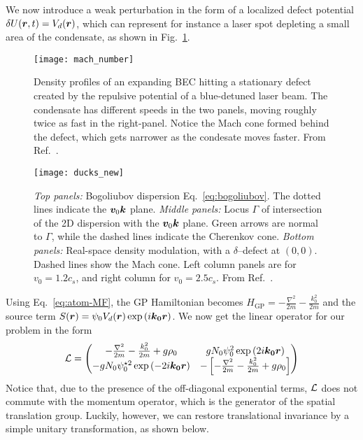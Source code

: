 We now introduce a weak perturbation in the form of a localized defect
potential $\delta U(\bm{r}, t) = V_d(\bm{r})$, which can represent for
instance a laser spot depleting a small area of the condensate, as
shown in Fig.~\ref{fig:mach-number}.
%
\begin{figure}[tb]\centering
  \texttt{[image: mach\_number]}
  \caption{
    Density profiles of an expanding BEC hitting a stationary defect
created by the repulsive potential of a blue-detuned laser beam. The
condensate has different speeds in the two panels, moving roughly
twice as fast in the right-panel. Notice the Mach cone formed behind
the defect, which gets narrower as the condesate moves faster. From
Ref.~\cite{Carusotto_2006}.
}\label{fig:mach-number}
\end{figure}
% 
\begin{figure}[tb]\centering
  \texttt{[image: ducks\_new]}
  \caption{
    \emph{Top panels:} Bogoliubov dispersion
Eq.~\eqref{eq:bogoliubov}. The dotted lines indicate the $\bm{v}_0
\bm{k}$ plane.
    \emph{Middle panels:} Locus $\Gamma$ of intersection of the 2D
dispersion with the $\bm{v}_0 \bm{k}$ plane. Green arrows are normal
to $\Gamma$, while the dashed lines indicate the Cherenkov
cone.
    \emph{Bottom panels:} Real-space density modulation, with a
$\delta$--defect at $(0,0)$. Dashed lines show the Mach cone. Left
column panels are for $v_0 = 1.2 c_s$, and right column for $v_0 = 2.5
c_s$. From Ref.~\cite{9783319002651}.
}\label{fig:bogo-cherenkov}
\end{figure}

Using Eq.~\eqref{eq:atom-MF}, the GP Hamiltonian becomes
$H_{\text{GP}} = -\frac{\nabla^2}{2m} - \frac{k_0^2}{2m}$ and the
source term
$S(\bm{r}) = \psi_0 V_d(\bm{r}) \exp \left( i \bm{k_0} \bm{r} \right)$. We now
get the linear operator for our problem in the form
%
\begin{equation}\label{eq:ourL}
  \mathcal{L} = \begin{pmatrix} -\frac{\nabla^2}{2m} - \frac{k_0^2}{2m} + g\rho_0 & g N_0 \psi_0^2 \exp \left( 2 i \bm{k_0} \bm{r} \right)\\ - g N_0 \psi_0^{\star 2} \exp \left( - 2 i \bm{k_0} \bm{r} \right) & -\left[ -\frac{\nabla^2}{2m} - \frac{k_0^2}{2m} + g\rho_0 \right] \end{pmatrix}
\end{equation}
% 
Notice that, due to the presence of the off-diagonal exponential
terms, $\mathcal{L}$ does not commute with the momentum operator, which is
the generator of the spatial translation group. Luckily, however, we
can restore translational invariance by a simple unitary
transformation, as shown below.

